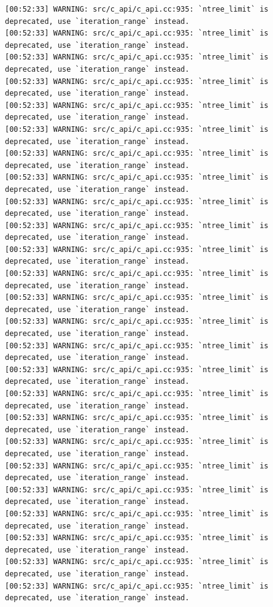 \documentclass[
  letterpaper,
  DIV=11,
  numbers=noendperiod]{scrartcl}
\begin{document}
\begin{verbatim}
[00:52:33] WARNING: src/c_api/c_api.cc:935: `ntree_limit` is deprecated, use `iteration_range` instead.
[00:52:33] WARNING: src/c_api/c_api.cc:935: `ntree_limit` is deprecated, use `iteration_range` instead.
[00:52:33] WARNING: src/c_api/c_api.cc:935: `ntree_limit` is deprecated, use `iteration_range` instead.
[00:52:33] WARNING: src/c_api/c_api.cc:935: `ntree_limit` is deprecated, use `iteration_range` instead.
[00:52:33] WARNING: src/c_api/c_api.cc:935: `ntree_limit` is deprecated, use `iteration_range` instead.
[00:52:33] WARNING: src/c_api/c_api.cc:935: `ntree_limit` is deprecated, use `iteration_range` instead.
[00:52:33] WARNING: src/c_api/c_api.cc:935: `ntree_limit` is deprecated, use `iteration_range` instead.
[00:52:33] WARNING: src/c_api/c_api.cc:935: `ntree_limit` is deprecated, use `iteration_range` instead.
[00:52:33] WARNING: src/c_api/c_api.cc:935: `ntree_limit` is deprecated, use `iteration_range` instead.
[00:52:33] WARNING: src/c_api/c_api.cc:935: `ntree_limit` is deprecated, use `iteration_range` instead.
[00:52:33] WARNING: src/c_api/c_api.cc:935: `ntree_limit` is deprecated, use `iteration_range` instead.
[00:52:33] WARNING: src/c_api/c_api.cc:935: `ntree_limit` is deprecated, use `iteration_range` instead.
[00:52:33] WARNING: src/c_api/c_api.cc:935: `ntree_limit` is deprecated, use `iteration_range` instead.
[00:52:33] WARNING: src/c_api/c_api.cc:935: `ntree_limit` is deprecated, use `iteration_range` instead.
[00:52:33] WARNING: src/c_api/c_api.cc:935: `ntree_limit` is deprecated, use `iteration_range` instead.
[00:52:33] WARNING: src/c_api/c_api.cc:935: `ntree_limit` is deprecated, use `iteration_range` instead.
[00:52:33] WARNING: src/c_api/c_api.cc:935: `ntree_limit` is deprecated, use `iteration_range` instead.
[00:52:33] WARNING: src/c_api/c_api.cc:935: `ntree_limit` is deprecated, use `iteration_range` instead.
[00:52:33] WARNING: src/c_api/c_api.cc:935: `ntree_limit` is deprecated, use `iteration_range` instead.
[00:52:33] WARNING: src/c_api/c_api.cc:935: `ntree_limit` is deprecated, use `iteration_range` instead.
[00:52:33] WARNING: src/c_api/c_api.cc:935: `ntree_limit` is deprecated, use `iteration_range` instead.
[00:52:33] WARNING: src/c_api/c_api.cc:935: `ntree_limit` is deprecated, use `iteration_range` instead.
[00:52:33] WARNING: src/c_api/c_api.cc:935: `ntree_limit` is deprecated, use `iteration_range` instead.
[00:52:33] WARNING: src/c_api/c_api.cc:935: `ntree_limit` is deprecated, use `iteration_range` instead.
[00:52:33] WARNING: src/c_api/c_api.cc:935: `ntree_limit` is deprecated, use `iteration_range` instead.

\end{verbatim}
\end{document}

